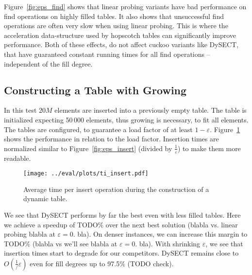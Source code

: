 \documentclass[a4paper,UKenglish]{lipics-v2016}
\begin{document}
Figure~\ref{fig:eps_find} shows that linear probing variants have bad
performance on find operations on highly filled tables.  It also shows
that unsuccessful find operations are often very slow when using
linear probing.  This is where the acceleration data-structure used by
hopscotch tables can significantly improve performance.  Both of these
effects, do not affect cuckoo variants like DySECT, that have
guaranteed constant running times for all find operations --
independent of the fill degree.

\subsection{Constructing a Table with Growing}
\label{sec:exp_ti}
In this test $20M$ elements are inserted into a previously empty
table.  The table is initialized expecting 50\,000 elements, thus
growing is necessary, to fit all elements.  The tables are configured,
to guarantee a load factor of at least
$1-\varepsilon$. Figure~\ref{fig:ti_insert} shows the performance in
relation to the load factor.  Insertion times are normalized similar to
Figure~\ref{fig:eps_insert} (divided by $\frac{1}{\varepsilon}$) to
make them more readable.

\begin{figure}[ht]
  \centering
  \texttt{[image: ../eval/plots/ti\_insert.pdf]}
  \caption{\label{fig:ti_insert}Average time per insert operation
    during the construction of a dynamic table.}
\end{figure}

We see that DySECT performs by far the best even with less filled
tables.  Here we achieve a speedup of TODO$\%$ over the next best
solution (blabla vs. linear probing blabla at $\varepsilon = 0.$ bla).
On denser instances, we can increase this margin to TODO$\%$ (blabla
vs we'll see blabla at $\varepsilon = 0.$ bla).  With shrinking
$\varepsilon$, we see that insertion times start to degrade for our
competitors.  DySECT remains close to $O(\frac{1}/{\varepsilon})$ even
for fill degrees up to 97.5$\%$ (TODO check).
\end{document}
